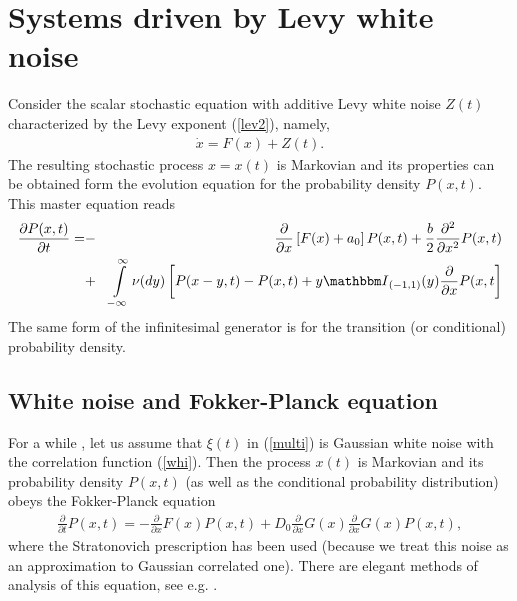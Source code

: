\documentclass[authoryear,draft,1p,times]{elsarticle}
\renewcommand{\=}{\stackrel{\mathrm{d}}{=}}
\begin{document}

\section{Systems driven by Levy white noise} 

Consider the scalar stochastic equation with additive Levy  white noise  $Z(t)$ characterized by the Levy exponent (\ref{lev2}), namely, 
%
\begin{eqnarray}
\label{MaLev}
 \dot x= F(x) + Z(t). 
\end{eqnarray}
%
The resulting stochastic process $x=x(t)$ is Markovian and its  properties can be obtained form the evolution equation for the probability density $P(x, t)$. This master equation reads
%
\begin{eqnarray} \label{mas}
 {\partial P(x, t) \over \partial t} =&-&{\partial\over \partial x}
\left[F(x)+  a_0\right]P(x, t)  + \frac{b}{2} {\partial^2 \over \partial x^2} P(x, t)\nonumber \\
&+& \int\limits_{- \infty}^{\infty}\nu(dy) \left[P(x-y, t)-P(x, t)  + y 
{\mathbbm I}_{(-1,1)}(y) 
\frac{\partial}{\partial x} P(x,t\right]
\end{eqnarray}
The same form of the infinitesimal generator is  for the  transition (or conditional) 
probability density. 
 
\subsection{White noise and Fokker-Planck equation}


For a while , let us assume that $\xi(t)$ in (\ref{multi}) 
is Gaussian white noise with the 
correlation function (\ref{whi}). Then the process $x(t)$ 
is Markovian and its 
probability density $P(x,t)$ (as well as the conditional probability 
distribution) obeys the Fokker-Planck equation \cite{gar} 
%
\begin{eqnarray}  \label{FP}
 \frac{\partial}{\partial t} P(x,t)
= -\frac{\partial}{\partial  x}  F(x) P(x,t)
 +  D_0 \frac{\partial}{\partial x}G(x)\frac{\partial}{\partial x}G(x) P(x,t), 
\end{eqnarray}
%
where the Stratonovich prescription has been used (because we treat 
this noise as an approximation to  Gaussian correlated one). 
There are elegant methods of analysis of this equation, 
see e.g. \cite{risk}.  
\end{document}
